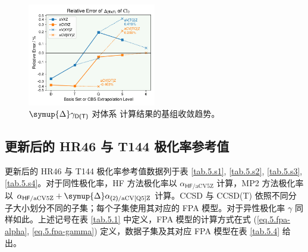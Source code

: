 \begin{figure}[ht]
    \centering
    \includegraphics[width=0.5\textwidth]{assets/Cl2-aniso.pdf}
    \caption[$\symup{\Delta} \gamma_\textsf{D(T)}$ 对体系  计算结果的基组收敛趋势]{$\symup{\Delta} \gamma_\textsf{D(T)}$ 对体系  计算结果的基组收敛趋势。}
    \label{fig.Cl2-aniso}
\end{figure}

\newpage

\subsection{更新后的 HR46 与 T144 极化率参考值}

更新后的 HR46 与 T144 极化率参考值数据列于表 \ref{tab.5.s1}, \ref{tab.5.s2}, \ref{tab.5.s3}, \ref{tab.5.s4}。对于同性极化率，HF 方法极化率以 $\alpha_{\textsf{HF}/\text{aCV5Z}}$ 计算，MP2 方法极化率以 $\alpha_{\textsf{HF}/\text{aCV5Z}} + \symup{\Delta} \alpha_{\textsf{(2)}/\text{aCV[Q5]Z}}$ 计算。CCSD 与 CCSD(T) 依照不同分子大小划分不同的子集；每个子集使用其对应的 FPA 模型。对于异性极化率 $\gamma$ 同样如此。上述记号在表 \ref{tab.5.1} 中定义，FPA 模型的计算方式在式 (\ref{eq.5.fpa-alpha}, \ref{eq.5.fpa-gamma}) 定义，数据子集及其对应 FPA 模型在表 \ref{tab.5.4} 给出。

\begingroup
\setlength{\LTleft}{-20cm plus -1fill}
\setlength{\LTright}{\LTleft}

